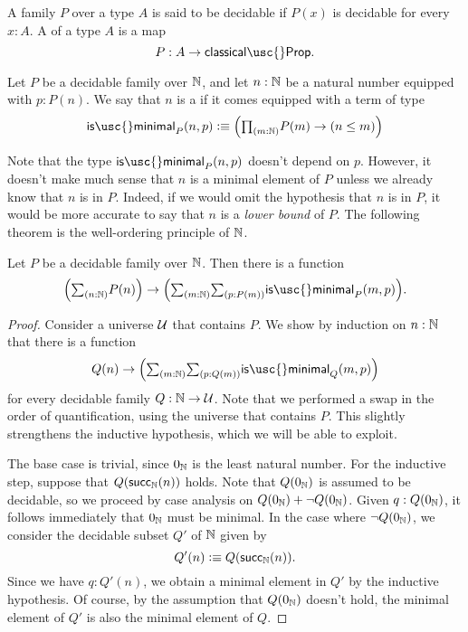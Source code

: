 \begin{defn}
  A family $P$ over a type $A$ is said to be decidable if $P(x)$ is decidable for every $x:A$. A  of a type $A$ is a map
  \begin{equation*}
    P:A\to\mathsf{classical\usc{}Prop}.
  \end{equation*}
\end{defn}

\begin{defn}
  Let $P$ be a decidable family over ${\mathbb{N}}$, and let $n:{\mathbb{N}}$ be a natural number equipped with $p:P(n)$. We say that $n$ is a  if it comes equipped with a term of type
  \begin{equation*}
    \mathsf{is\usc{}minimal}_P(n,p)\defeq \Big(\prd{m:\N}P(m)\to (n\leq m)\Big)
  \end{equation*}
\end{defn}

Note that the type $\mathsf{is\usc{}minimal}_P(n,p)$ doesn't depend on $p$. However, it doesn't make much sense that $n$ is a minimal element of $P$ unless we already know that $n$ is in $P$. Indeed, if we would omit the hypothesis that $n$ is in $P$, it would be more accurate to say that $n$ is a \emph{lower bound} of $P$. The following theorem is the well-ordering principle of ${\mathbb{N}}$. 

\begin{thm}
  Let $P$ be a decidable family over ${\mathbb{N}}$. Then there is a function
  \begin{equation*}
    \Big(\sm{n:\N}P(n)\Big)\to\Big(\sm{m:\N}{p:P(m)}\mathsf{is\usc{}minimal}_P(m,p)\Big).
  \end{equation*}
\end{thm}

\begin{proof}
  Consider a universe $\mathcal{U}$ that contains $P$. We show by induction on $n:{\mathbb{N}}$ that there is a function
  \begin{equation*}
    Q(n)\to \Big(\sm{m:\N}{p:Q(m)}\mathsf{is\usc{}minimal}_Q(m,p)\Big) 
  \end{equation*}
  for every decidable family $Q:{\mathbb{N}}\to\mathcal{U}$. Note that we performed a swap in the order of quantification, using the universe that contains $P$. This slightly strengthens the inductive hypothesis, which we will be able to exploit.

  The base case is trivial, since $0_{{\mathbb{N}}}$ is the least natural number. For the inductive step, suppose that $Q(\mathsf{succ}_{{\mathbb{N}}}(n))$ holds. Note that $Q(0_{{\mathbb{N}}})$ is assumed to be decidable, so we proceed by case analysis on $Q(0_{{\mathbb{N}}})+\neg Q(0_{{\mathbb{N}}})$. Given $q:Q(0_{{\mathbb{N}}})$, it follows immediately that $0_{{\mathbb{N}}}$ must be minimal. In the case where $\neg Q(0_{{\mathbb{N}}})$, we consider the decidable subset $Q'$ of ${\mathbb{N}}$ given by
  \begin{equation*}
    Q'(n)\vcentcolon\equiv Q(\mathsf{succ}_{{\mathbb{N}}}(n)).
  \end{equation*}
  Since we have $q:Q'(n)$, we obtain a minimal element in $Q'$ by the inductive hypothesis. Of course, by the assumption that $Q(0_{{\mathbb{N}}})$ doesn't hold, the minimal element of $Q'$ is also the minimal element of $Q$.
\end{proof}

